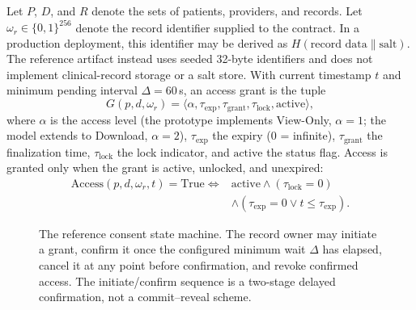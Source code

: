 \documentclass[journal]{IEEEtran}
\begin{document}
Let $P$, $D$, and $R$ denote the sets of patients, providers, and records. Let $\omega_r\in\{0,1\}^{256}$ denote the record identifier supplied to the contract. In a production deployment, this identifier may be derived as $H(\text{record data}\parallel\text{salt})$. The reference artifact instead uses seeded 32-byte identifiers and does not implement clinical-record storage or a salt store. With current timestamp $t$ and minimum pending interval $\Delta = 60$\,s, an access grant is the tuple
\begin{equation}
\label{eq:grant}
G(p,d,\omega_r)=\langle \alpha,\tau_{\text{exp}},\tau_{\text{grant}},\tau_{\text{lock}},\text{active}\rangle,
\end{equation}
where $\alpha$ is the access level (the prototype implements View-Only, $\alpha=1$; the model extends to Download, $\alpha=2$), $\tau_{\text{exp}}$ the expiry ($0$ = infinite), $\tau_{\text{grant}}$ the finalization time, $\tau_{\text{lock}}$ the lock indicator, and $\text{active}$ the status flag. Access is granted only when the grant is active, unlocked, and unexpired:
\begin{equation}
\label{eq:access-check}
\begin{aligned}
\text{Access}(p,d,\omega_r,t)=\text{True}\iff{}&\text{active}\land(\tau_{\text{lock}}=0)\\
&\land(\tau_{\text{exp}}=0\lor t\le\tau_{\text{exp}}).
\end{aligned}
\end{equation}

\begin{figure}[!t]
\centering
{}
\caption{The reference consent state machine. The record owner may initiate a grant, confirm it once the configured minimum wait $\Delta$ has elapsed, cancel it at any point before confirmation, and revoke confirmed access. The initiate/confirm sequence is a two-stage delayed confirmation, not a commit--reveal scheme.}
\label{fig:state-machine}
\end{figure}
\end{document}
